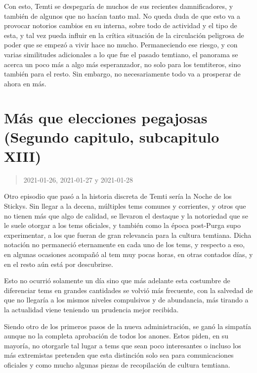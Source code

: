 \documentclass[
  spanish,
]{book}
\begin{document}
Con esto, Temti se despegaría de muchos de sus recientes damnificadores, y también de algunos que no hacían tanto mal. No queda duda de que esto va a provocar notorios cambios en su interna, sobre todo de actividad y el tipo de esta, y tal vez pueda influir en la crítica situación de la circulación peligrosa de poder que se empezó a vivir hace no mucho. Permaneciendo ese riesgo, y con varias similitudes adicionales a lo que fue el pasado temtiano, el panorama se acerca un poco más a algo más esperanzador, no solo para los temtiteros, sino también para el resto. Sin embargo, no necesariamente todo va a prosperar de ahora en más.

\hypertarget{muxe1s-que-elecciones-pegajosas-segundo-capitulo-subcapitulo-xiii}{%
\section{Más que elecciones pegajosas (Segundo capitulo, subcapitulo XIII)}\label{muxe1s-que-elecciones-pegajosas-segundo-capitulo-subcapitulo-xiii}}

\begin{quote}
2021-01-26, 2021-01-27 y 2021-01-28
\end{quote}

Otro episodio que pasó a la historia discreta de Temti sería la Noche de los Stickys. Sin llegar a la decena, múltiples tems comunes y corrientes, y otros que no tienen más que algo de calidad, se llevaron el destaque y la notoriedad que se le suele otorgar a los tems oficiales, y también como la época post-Purga supo experimentar, a los que fueran de gran relevancia para la cultura temtiana. Dicha notación no permaneció eternamente en cada uno de los tems, y respecto a eso, en algunas ocasiones acompañó al tem muy pocas horas, en otras contados días, y en el resto aún está por descubrirse.

Esto no ocurrió solamente un día sino que más adelante esta costumbre de diferenciar tems en grandes cantidades se volvió más frecuente, con la salvedad de que no llegaría a los mismos niveles compulsivos y de abundancia, más tirando a la actualidad viene teniendo un prudencia mejor recibida.

Siendo otro de los primeros pasos de la nueva administración, se ganó la simpatía aunque no la completa aprobación de todos los anones. Estos piden, en su mayoría, no otorgarle tal lugar a tems que sean poco interesantes o incluso los más extremistas pretenden que esta distinción solo sea para comunicaciones oficiales y como mucho algunas piezas de recopilación de cultura temtiana.
\end{document}
